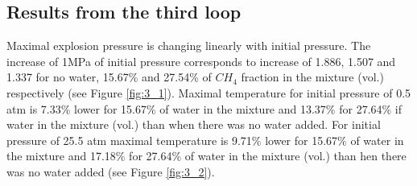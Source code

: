 \documentclass[a4paper]{article}
\begin{document}
\subsection{Results from the third loop}
Maximal explosion pressure is changing linearly with initial pressure. The increase of 1MPa of initial pressure corresponds to increase of 1.886, 1.507 and 1.337 for no water, 15.67\% and 27.54\% of $CH_4$ fraction in the mixture (vol.) respectively (see Figure \ref{fig:3_1}).
Maximal temperature for initial pressure of 0.5 atm is 7.33\% lower for 15.67\% of water in the mixture and 13.37\% for 27.64\% if water in the mixture (vol.) than when there was no water added. For initial pressure of 25.5 atm maximal temperature is 9.71\% lower for 15.67\% of water in the mixture and 17.18\% for 27.64\% of water in the mixture (vol.) than hen there was no water added (see Figure \ref{fig:3_2}).
\end{document}
